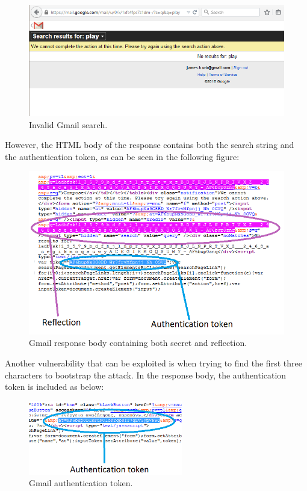 \begin{figure}[H] \caption{Invalid Gmail search.} \centering
\includegraphics[width=1\textwidth]{diagrams/gmail_search.png}\end{figure}

However, the HTML body of the response contains both the search string and the
authentication token, as can be seen in the following figure:

\begin{figure}[H] \caption{Gmail response body containing both secret and
reflection.} \centering
\includegraphics[width=1\textwidth]{diagrams/gmail_response.png}\end{figure}

Another vulnerability that can be exploited is when trying to find the first
three characters to bootstrap the attack. In the response body, the
authentication token is included as below:

\begin{figure}[H] \caption{Gmail authentication token.} \centering
\includegraphics[width=0.6\textwidth]{diagrams/gmail_bootstrap.png}\end{figure}

